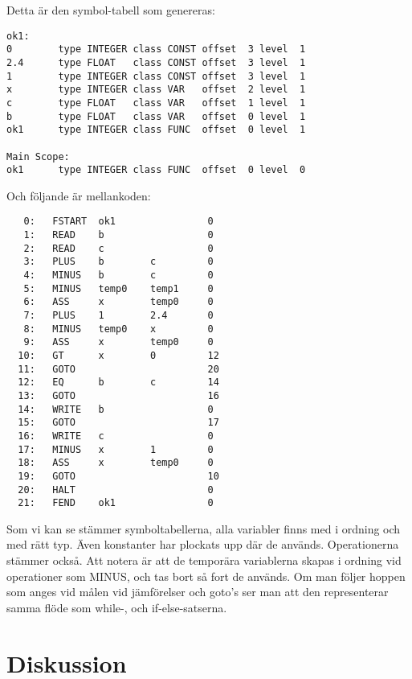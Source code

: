 		Detta är den symbol-tabell som genereras:
\begin{verbatim}
ok1:
0        type INTEGER class CONST offset  3 level  1
2.4      type FLOAT   class CONST offset  3 level  1
1        type INTEGER class CONST offset  3 level  1
x        type INTEGER class VAR   offset  2 level  1
c        type FLOAT   class VAR   offset  1 level  1
b        type FLOAT   class VAR   offset  0 level  1
ok1      type INTEGER class FUNC  offset  0 level  1

Main Scope:
ok1      type INTEGER class FUNC  offset  0 level  0
\end{verbatim}

		Och följande är mellankoden:
	
\begin{footnotesize}	
\begin{verbatim}
   0:	FSTART  ok1                0
   1:	READ    b                  0
   2:	READ    c                  0
   3:	PLUS    b        c         0
   4:	MINUS   b        c         0
   5:	MINUS   temp0    temp1     0
   6:	ASS     x        temp0     0
   7:	PLUS    1        2.4       0
   8:	MINUS   temp0    x         0
   9:	ASS     x        temp0     0
  10:	GT      x        0         12
  11:	GOTO                       20
  12:	EQ      b        c         14
  13:	GOTO                       16
  14:	WRITE   b                  0
  15:	GOTO                       17
  16:	WRITE   c                  0
  17:	MINUS   x        1         0
  18:	ASS     x        temp0     0
  19:	GOTO                       10
  20:	HALT                       0
  21:	FEND    ok1	               0
\end{verbatim}\end{footnotesize}

	Som vi kan se stämmer symboltabellerna, alla variabler finns med i ordning och med rätt typ. Även konstanter har plockats upp där de används.
	Operationerna stämmer också. Att notera är att de temporära variablerna skapas i ordning vid operationer som MINUS, och tas bort så fort de används.
	Om man följer hoppen som anges vid målen vid jämförelser och goto's ser man att den representerar samma flöde som while-, och if-else-satserna.


\section{Diskussion}


